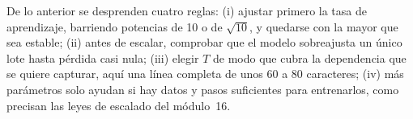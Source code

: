 \begin{observacion}\label{obs:reglas}
De lo anterior se desprenden cuatro reglas: (i) ajustar primero la tasa de aprendizaje, barriendo potencias de 10 o de $\sqrt{10}$, y quedarse con la mayor que sea estable; (ii) antes de escalar, comprobar que el modelo sobreajusta un único lote hasta pérdida casi nula; (iii) elegir $T$ de modo que cubra la dependencia que se quiere capturar, aquí una línea completa de unos 60 a 80 caracteres; (iv) más parámetros solo ayudan si hay datos y pasos suficientes para entrenarlos, como precisan las leyes de escalado del módulo~16.
\end{observacion}


